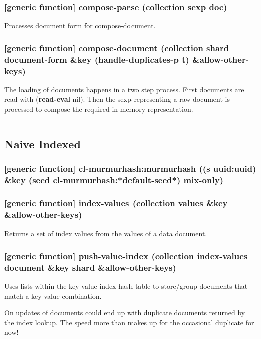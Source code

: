 \documentclass[11pt]{article}
\begin{document}
\subsubsection{[generic function] compose-parse (collection sexp doc)}
\label{sec:org185aa4c}

Processes document form for compose-document.

\subsubsection{[generic function] compose-document (collection shard document-form \&key (handle-duplicates-p t)  \&allow-other-keys)}
\label{sec:org0341924}

The loading of documents happens in a two step process. First
documents are read with (\textbf{read-eval} nil). Then the sexp representing
a raw document is processed to compose the required in memory
representation.

\noindent\rule{\textwidth}{0.5pt}


\subsection{Naive Indexed}
\label{sec:org758c177}

\subsubsection{[generic function] cl-murmurhash:murmurhash ((s uuid:uuid) \&key (seed cl-murmurhash:*default-seed*) mix-only)}
\label{sec:orgc172dc2}

\subsubsection{[generic function] index-values (collection values \&key \&allow-other-keys)}
\label{sec:orgf934af1}

Returns a set of index values from the values of a data document.

\subsubsection{[generic function] push-value-index (collection index-values document \&key shard \&allow-other-keys)}
\label{sec:orgeffcc50}

Uses lists within the key-value-index hash-table to store/group
documents that match a key value combination.

On updates of documents could end up with duplicate documents returned
by the index lookup. The speed more than makes up for the occasional
duplicate for now!
\end{document}
